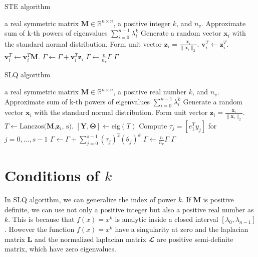 \documentclass[senior,final,11pt]{iscs-thesis}
\begin{document}
\begin{algorithm}
    \caption{STE algorithm}
    \begin{algorithmic}[1]
    \renewcommand{\algorithmicrequire}{\textbf{Input:}}
    \renewcommand{\algorithmicensure}{\textbf{Output:}}
    \REQUIRE a real symmetric matrix ${\mathbf M} \in {\mathbb R}^{n\times n}$, a positive integer $k$, and $n_v$.
    \ENSURE  Approximate sum of k-th powers of eigenvalues $\sum_{i=0}^{n-1} \lambda_i^k$
     \STATE Generate a random vector $\mathbf{x}_i$ with the standard normal distribution.
     \STATE Form unit vector $\mathbf{z}_i = \frac{\mathbf{x}_i}{\|\mathbf{x}_i\|_2}$.
     \STATE $\mathbf{v}_i^T \leftarrow \mathbf{z}_i^T $.
        \STATE $\mathbf{v}_i^T \leftarrow \mathbf{v}_i^T {\mathbf M}$.
        \ENDFOR
     \STATE $\Gamma \leftarrow \Gamma + \mathbf{v}_i^T \mathbf{z}_i$
     \ENDFOR
    \STATE $\Gamma \leftarrow \frac{n}{n_v}\Gamma$
    \RETURN $\Gamma$
    \end{algorithmic}
\end{algorithm}

\begin{algorithm}
    \caption{SLQ algorithm}
    \begin{algorithmic}[1]
    \renewcommand{\algorithmicrequire}{\textbf{Input:}}
    \renewcommand{\algorithmicensure}{\textbf{Output:}}
    \REQUIRE a real symmetric matrix ${\mathbf M} \in {\mathbb R}^{n\times n}$, a positive real number $k$, and $n_v$.
    \ENSURE  Approximate sum of k-th powers of eigenvalues $\sum_{i=0}^{n-1} \lambda_i^k$
     \STATE Generate a random vector $\mathbf{x}_i$ with the standard normal distribution.
     \STATE Form unit vector $\mathbf{z}_i = \frac{\mathbf{x}_i}{\|\mathbf{x}_i\|_2}$.
     \STATE $T \leftarrow \text{Lanczos($\mathbf{M}$,$\mathbf{z}_i$, s)}$.
     \STATE $[\mathbf{Y}, \mathbf{\Theta}] \leftarrow \text{eig}(T)$
     \STATE Compute $\tau_j = [e_1^T y_j]$ for $j=0, ..., s-1$
     \STATE $\Gamma \leftarrow \Gamma + \sum_{j=0}^{s-1} (\tau_j)^2 (\theta_j)^k$
     \ENDFOR
    \STATE $\Gamma \leftarrow \frac{n}{n_v}\Gamma$
    \RETURN $\Gamma$
    \end{algorithmic}
\end{algorithm}


\section{Conditions of $k$}
In SLQ algorithm, we can generalize the index of power $k$. If ${\mathbf M}$ is positive definite, we can use not only a positive integer but also a positive real number as $k$. This is because that $f(x)=x^k$ is analytic inside a closed interval $[\lambda_0, \lambda_{n-1}]$. However the function $f(x)=x^k$ have a singularity at zero and the laplacian matrix ${\mathbf L}$ and the normalized laplacian matrix ${\mathbfcal L}$ are positive semi-definite matrix, which have zero eigenvalues.
\end{document}
